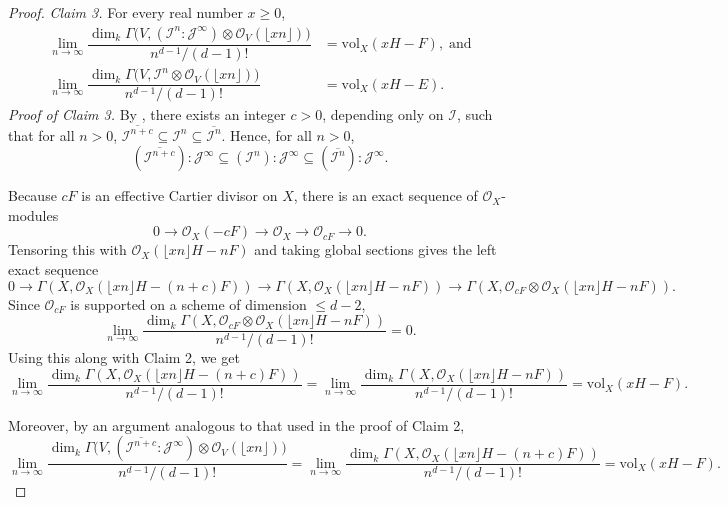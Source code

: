 \documentclass[12pt,a4paper]{amsart}
\theoremstyle{plain}
\theoremstyle{definition}
\numberwithin{equation}{theorem}
\begin{document}
\begin{proof}
\vspace{0.6em}
\noindent\textit{Claim 3.} For every real number $x\geq 0$,
\begin{align*}
 \lim_{n\to\infty}\dfrac{\dim_k \Gamma \big(V,(\mathcal{I}^n\colon \mathcal{J}^{\infty})\otimes\mathcal{O}_V\left(\lfloor xn\rfloor\right)\big)}{n^{d-1}/(d-1)!} &= \mathrm{vol}_X(xH-F),\;\text{and}\\
 \lim_{n\to\infty}\dfrac{\dim_k \Gamma \big(V,\mathcal{I}^n\otimes\mathcal{O}_V\left(\lfloor xn\rfloor\right)\big)}{n^{d-1}/(d-1)!} &= \mathrm{vol}_X(xH-E).
\end{align*}
\noindent\textit{Proof of Claim 3.} By \cite[Theorem 1.4]{Ree61a}, there exists an integer $c>0$, depending only on $\mathcal{I}$, such that for all $n>0$, $\overline{\mathcal{I}^{n+c}} \subseteq \mathcal{I}^{n} \subseteq \overline{\mathcal{I}^n}$. Hence, for all $n>0$, $${(\overline{\mathcal{I}^{n+c}})}\colon \mathcal{J}^{\infty} \subseteq {(\mathcal{I}^{n})}\colon \mathcal{J}^{\infty} \subseteq {(\overline{\mathcal{I}^n})}\colon \mathcal{J}^{\infty}.$$

Because $cF$ is an effective Cartier divisor on $X$, there is an exact sequence of $\mathcal{O}_X$-modules $$0 \to \mathcal{O}_X(-cF) \to \mathcal{O}_X \to \mathcal{O}_{cF} \to 0.$$ Tensoring this with $\mathcal{O}_X\left(\lfloor xn\rfloor H - nF\right)$ and taking global sections gives the left exact sequence $$0 \to \Gamma \left(X,\mathcal{O}_X\left(\lfloor xn\rfloor H - (n+c)F\right)\right) \to \Gamma \left(X,\mathcal{O}_X\left(\lfloor xn\rfloor H - nF\right)\right) \to \Gamma \left(X,\mathcal{O}_{cF}\otimes\mathcal{O}_X\left(\lfloor xn\rfloor H - nF\right)\right).$$ Since $\mathcal{O}_{cF}$ is supported on a scheme of dimension $\leq d-2$, $$\lim_{n\to\infty}\dfrac{\dim_k \Gamma \left(X,\mathcal{O}_{cF}\otimes\mathcal{O}_X\left(\lfloor xn\rfloor H - nF\right)\right)}{n^{d-1}/(d-1)!}=0.$$ Using this along with Claim 2, we get $$\lim_{n\to\infty}\dfrac{\dim_k \Gamma \left(X,\mathcal{O}_X\left(\lfloor xn\rfloor H - (n+c)F\right)\right)}{n^{d-1}/(d-1)!} = \lim_{n\to\infty}\dfrac{\dim_k \Gamma \left(X,\mathcal{O}_X\left(\lfloor xn\rfloor H - nF\right)\right)}{n^{d-1}/(d-1)!} = \mathrm{vol}_X(xH-F).$$

Moreover, by an argument analogous to that used in the proof of Claim 2, $$\lim_{n\to\infty}\dfrac{\dim_k \Gamma \big(V,(\overline{\mathcal{I}^{n+c}}\colon \mathcal{J}^{\infty})\otimes\mathcal{O}_V\left(\lfloor xn\rfloor\right)\big)}{n^{d-1}/(d-1)!} = \lim_{n\to\infty}\dfrac{\dim_k \Gamma \left(X,\mathcal{O}_X\left(\lfloor xn\rfloor H - (n+c)F\right)\right)}{n^{d-1}/(d-1)!} = \mathrm{vol}_X(xH-F).$$


\end{proof}
\end{document}
